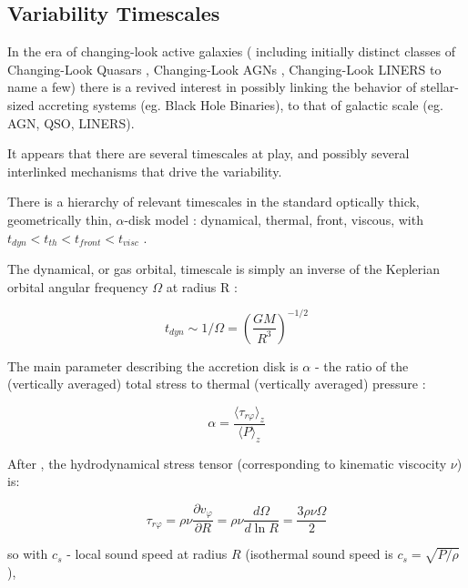 \documentclass[twocolumn]{aastex62}
\begin{document}
\subsection{Variability Timescales}

In the era of changing-look active galaxies ( including initially distinct classes of Changing-Look Quasars \citep{lamassa2015, macleod2019}, Changing-Look AGNs \citep{marchese2012, bianchi2009,risaliti2009}, Changing-Look LINERS \citep{frederick2019} to name a few) there is a revived interest in possibly linking the behavior of stellar-sized accreting systems (eg. Black Hole Binaries),  to that of galactic scale (eg. AGN, QSO, LINERS)\citep{noda2018, ruan2019}. 

It appears that there are several timescales at play, and possibly several interlinked mechanisms that drive the variability. 

There is a hierarchy of relevant timescales in the standard optically thick, geometrically thin, $\alpha$-disk model : dynamical, thermal, front, viscous, with   $t_{dyn} < t_{th} < t_{front}  < t_{visc} $ \citep{netzer2013, frank2002}.

The dynamical, or gas orbital, timescale is simply  an inverse of the Keplerian orbital angular frequency $ \Omega$  at radius R  : 

\begin{equation}
t_{dyn} {\sim}  1 / \Omega = \left( \frac{GM}{R^{3}}\right)^{-1/2}
\end{equation}


The main parameter  describing the accretion disk is $\alpha$ - the ratio of the (vertically averaged) total stress to thermal (vertically averaged) pressure \citep{lasota2016} : 

\begin{equation}
\alpha= \frac{\langle \tau_{r\varphi}  \rangle_{z} }{\langle P \rangle _{z}} 
\end{equation}


After \cite{lasota2016},  the hydrodynamical stress tensor (corresponding to  kinematic viscocity $\nu$) is:

\begin{equation}
\tau_{r\varphi } = \rho \nu \frac{\partial v_{\varphi}}{\partial R} = \rho \nu \frac{d \Omega}{d \ln{R}} = \frac{3 \rho \nu \Omega}{2}  
\end{equation}

so  with  $c_{s}$ -  local sound speed at radius $R$ (isothermal sound speed is $c_{s} = \sqrt{P/\rho}$),
\end{document}
